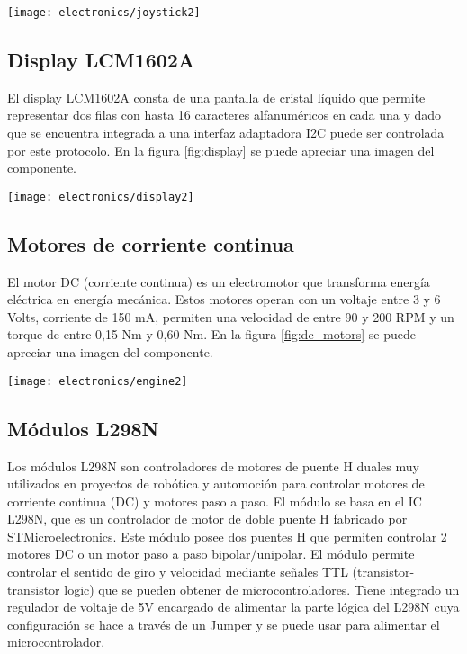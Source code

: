 \begin{center}
   \texttt{[image: electronics/joystick2]}
   \label{fig:joystick}
\end{center}


\subsection{Display LCM1602A}
El display LCM1602A \cite{LCM1602A_datasheet} consta de una pantalla de cristal líquido que permite representar dos filas con hasta 16 caracteres alfanuméricos en cada una y dado que se encuentra integrada a una interfaz adaptadora I2C puede ser controlada por este protocolo. En la figura \ref{fig:display} se puede apreciar una imagen del componente.

\begin{center}
   \texttt{[image: electronics/display2]}
   \label{fig:display}
\end{center}

\subsection{Motores de corriente continua}
El motor DC (corriente continua) \cite{dc_motor_datasheet} es un electromotor que transforma energía eléctrica en energía mecánica. Estos motores operan con un voltaje entre 3 y 6 Volts, corriente de 150 mA, permiten una velocidad de entre 90 y 200 RPM y un torque de entre 0,15 Nm y 0,60 Nm. En la figura \ref{fig:dc_motors} se puede apreciar una imagen del componente.


\begin{center}
 \texttt{[image: electronics/engine2]}
   \label{fig:dc_motors}
\end{center}


\subsection{Módulos L298N}
Los módulos L298N son controladores de motores de puente H duales muy utilizados en proyectos de robótica y automoción para controlar motores de corriente continua (DC) y motores paso a paso. El módulo se basa en el IC L298N, que es un controlador de motor de doble puente H fabricado por STMicroelectronics. Este módulo posee dos puentes H que permiten controlar 2 motores DC o un motor paso a paso bipolar/unipolar. El módulo permite controlar el sentido de giro y velocidad mediante señales TTL (transistor-transistor logic) que se pueden obtener de microcontroladores. Tiene integrado un regulador de voltaje de 5V encargado de alimentar la parte lógica del L298N cuya configuración se hace a través de un Jumper y se puede usar para alimentar el microcontrolador.

